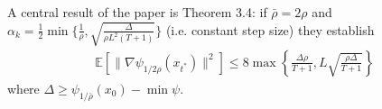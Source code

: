 \documentclass[12pt,a4paper,twoside]{article}
\theoremstyle{plain}
\theoremstyle{note}
\numberwithin{thm}{section}
\newcommand{\onehalf}{\frac{1}{2}}
\let\temp\phi
\let\phi\varphi
\let\varphi\temp
\begin{document}
	A central result of the paper is Theorem 3.4: if $\bar{\rho} = 2\rho$ and $\alpha_k = \onehalf \min \{\frac{1}{\rho}, \sqrt{\frac{\Delta}{\rho L^2(T+1)}}  \}$ (i.e. constant step size) they establish
	\begin{align*}
		\mathbb{E}[\|\nabla \psi_{1/2\rho}(x_{t^\ast})\|^2 ] \leq 8 \max \left\{ \frac{\Delta \rho}{T+1}, L\sqrt{\frac{\rho\Delta}{T+1}}\right\} 
	\end{align*}
	where  $\Delta \geq \psi_{1/\bar{\rho}}(x_0) - \min \psi$.\\
	\bigskip
	
%	

	
	
\end{document}
